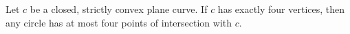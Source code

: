 Let $c$ be a closed, strictly convex plane curve. If $c$ has exactly four vertices, then any circle has at most four points of intersection with $c$.
